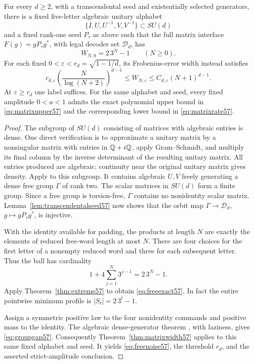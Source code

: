 \begin{theorem}
\label{thm:freeendpoint57}
For every $d\ge2$, with a transcendental seed and existentially selected generators, there is a fixed five-letter algebraic unitary alphabet
\[
                       \{I,U,U^{-1},V,V^{-1}\}\subset SU(d)
\]
and a fixed rank-one seed $P_\tau$ as above such that the full matrix
interface $F(g)=gP_\tau g^*$, with legal decoder set $\mathcal D_d$, has
\begin{equation}\label{eq:freeexact57}
                      W_{N,0}=2\,3^N-1\qquad(N\ge0).
\end{equation}
For each fixed $0<\varepsilon<r_d=\sqrt{1-1/d}$, its Frobenius-error width
instead satisfies
\begin{equation}\label{eq:freenoise57}
 c_{d,\varepsilon}\left(\frac{N}{\log(N+2)}\right)^{d-1}
 \le W_{N,\varepsilon}\le C_{d,\varepsilon}(N+1)^{d-1}.
\end{equation}
At $\varepsilon\ge r_d$ one label suffices. For the same alphabet and seed,
every fixed amplitude $0<a<1$ admits the exact polynomial upper bound in
\eqref{eq:matrixupper57} and the corresponding lower bound in
\eqref{eq:matrixrate57}.
\end{theorem}
\begin{proof}
The subgroup of $SU(d)$ consisting of matrices with algebraic entries is
dense. One direct verification is to approximate a unitary matrix by a
nonsingular matrix with entries in $\mathbb Q+i\mathbb Q$, apply Gram--Schmidt, and
multiply its final column by the inverse determinant of the resulting
unitary matrix. All entries produced are algebraic; continuity near the
original unitary matrix gives density. Apply
\cite[Theorem~1.1]{BreuillardGelander57} to this subgroup. It contains
algebraic $U,V$ freely generating a dense free group $\Gamma$ of rank two.
The scalar matrices in $SU(d)$ form a finite group. Since a free group is
torsion-free, $\Gamma$ contains no nonidentity scalar matrix.
Lemma~\ref{lem:transcendentalseed57} now shows that the orbit map
$\Gamma\to\mathcal D_d$, $g\mapsto gP_\tau g^*$, is injective.

With the identity available for padding, the products at length $N$ are
exactly the elements of reduced free-word length at most $N$. There are
four choices for the first letter of a nonempty reduced word and three
for each subsequent letter. Thus the ball has cardinality
\[
               1+4\sum_{j=1}^N3^{j-1}=2\,3^N-1.
\]
Apply Theorem~\ref{thm:extreme57} to obtain \eqref{eq:freeexact57}. In fact the
entire pointwise minimum profile is $|S_t|=2\,3^t-1$.

Assign a symmetric positive law to the four nonidentity commands and
positive mass to the identity. The algebraic dense-generator theorem
\cite{BG2012}, with laziness, gives \eqref{eq:groupgap57}. Consequently
Theorem~\ref{thm:matrixwidth57} applies to this same fixed alphabet and
seed. It yields \eqref{eq:freenoise57}, the threshold $r_d$, and the asserted
strict-amplitude conclusion.
\end{proof}
